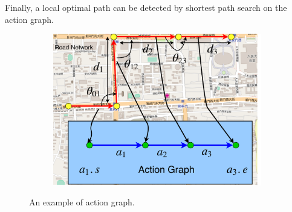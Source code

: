 
Finally, {a local optimal path can be detected by shortest path search on the action graph.}

\begin{figure}
    \begin{subfigure}{0.36\textwidth}
        \centering
        \includegraphics[width = \textwidth, height = 0.6\textwidth]{Figures/Fig-action-graph-en.pdf}
    \end{subfigure}
    \vspace{-2ex}
    \caption{\small {An example of action graph.}}\label{fig:action-graph}
    \vspace{-3ex}
\end{figure}
